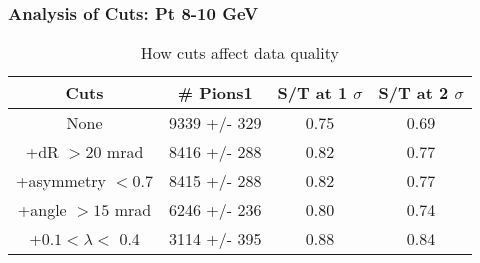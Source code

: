 \frame
{
\frametitle{Analysis of Cuts: Pt  8-10 GeV}
\begin{table}
\caption{How cuts affect data quality}
\centering
\begin{tabular}{c c c c}
\hline\hline
Cuts & \# Pions1 & S/T at 1 $\sigma$ & S/T at 2 $\sigma$ \\ [0.5ex]
\hline
None & 9339 +/-  329 & 0.75 & 0.69 \\ %
+dR $> 20$ mrad & 8416 +/-  288 & 0.82 & 0.77 \\ %
+asymmetry $< 0.7$ & 8415 +/-  288 & 0.82 & 0.77 \\ %
+angle $> 15$ mrad & 6246 +/-  236 & 0.80 & 0.74 \\ %
+$0.1 < \lambda <$ 0.4 & 3114 +/-  395 & 0.88 & 0.84 \\ %
[1ex]
\hline
\end{tabular}
\label{table:nonlin}
\end{table}
}
